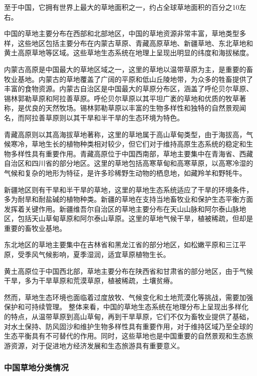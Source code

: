 \documentclass{article}
\begin{document}
	至于中国，它拥有世界上最大的草地面积之一，约占全球草地面积的百分之10左右。
	
	中国的草地主要分布在西部和北部地区，中国的草地资源非常丰富，草地类型多样，这些地区包括主要分布在内蒙古草原、青藏高原草地、新疆草地、东北草地和黄土高原草地等区域。这些草地生态系统在地理上呈现出明显的纬度和海拔梯度。
	
	内蒙古高原是中国最大的草地区域之一，这里的草地以温带草原为主，是重要的畜牧业基地。内蒙古的草地覆盖了广阔的平原和低山丘陵地带，为众多的牲畜提供了丰富的食物资源。内蒙古自治区是中国最大的草原分布区，涵盖了呼伦贝尔草原、锡林郭勒草原和阿拉善草原。呼伦贝尔草原以其平坦广袤的草地和优质的牧草著称，是优良的天然牧场。锡林郭勒草原以丰富的生物多样性和独特的自然景观闻名，而阿拉善草原则以其干旱和半干旱的生态环境为特色。
	
	青藏高原则以其高海拔草地著称，这里的草地属于高山草甸类型，由于海拔高，气候寒冷，草地生长的植物种类相对较少，但它们对于维持高原生态系统的稳定和生物多样性具有重要作用。青藏高原位于中国西南部，草地主要集中在青海省、西藏自治区和四川省的部分地区。这里的草地包括高寒草甸和高寒草原，以高寒冷湿的气候和复杂的地形为特征，是许多珍稀野生动物的栖息地，如藏羚羊和野牦牛。
	
	新疆地区则有干旱和半干旱的草地，这里的草地生态系统适应了干旱的环境条件，多为耐旱和耐盐碱的植物种类。新疆的草地在支持当地畜牧业和保护生态平衡方面发挥着关键作用。新疆维吾尔自治区的草地主要分布在天山山脉和阿尔泰山脉地区，包括天山草甸草原和阿尔泰山草原。这里的草地气候干旱，植被稀疏，但却是重要的畜牧业基地。
	
	东北地区的草地主要集中在吉林省和黑龙江省的部分地区，如松嫩平原和三江平原，受季风气候影响，夏季湿润，适宜草原植物生长。
	
	黄土高原位于中国西北部，草地主要分布在陕西省和甘肃省的部分地区，由于气候干旱，多为干旱草原和荒漠草原，植被稀疏，土壤贫瘠。
	
	然而，草地生态环境也面临着过度放牧、气候变化和土地荒漠化等挑战，需要加强保护和可持续管理。 整体来看，中国的草地生态系统在地理分布上呈现出多样化的特点，从温带草原到高山草甸，再到干旱草原，它们不仅为畜牧业提供了基础，对水土保持、防风固沙和维护生物多样性具有重要作用，对于维持区域乃至全球的生态平衡具有不可替代的作用。同时，这些草地也是中国重要的自然景观和生态旅游资源，对于促进地方经济发展和生态旅游具有重要意义。
	
	
		\subsubsection{中国草地分类情况}
		
\end{document}
